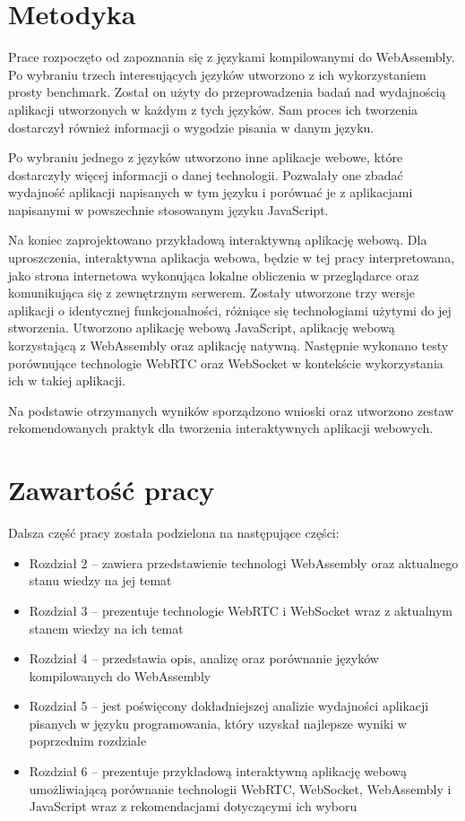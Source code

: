 \documentclass[language=polish,type=master]{aghmodern}
\begin{document}
\section{Metodyka}
Prace rozpoczęto od zapoznania się z językami kompilowanymi do WebAssembly.
Po wybraniu trzech interesujących języków utworzono z ich wykorzystaniem prosty benchmark.
Został on użyty do przeprowadzenia badań nad wydajnością aplikacji utworzonych w każdym z tych języków.
Sam proces ich tworzenia dostarczył również informacji o wygodzie pisania w danym języku.

Po wybraniu jednego z języków utworzono inne aplikacje webowe, które dostarczyły więcej informacji o danej technologii.
Pozwalały one zbadać wydajność aplikacji napisanych w tym języku i porównać je z aplikacjami napisanymi w powszechnie stosowanym języku JavaScript.

Na koniec zaprojektowano przykładową interaktywną aplikację webową.
Dla uproszczenia, interaktywna aplikacja webowa, będzie w tej pracy interpretowana, jako strona internetowa wykonująca lokalne obliczenia w przeglądarce oraz komunikująca się z zewnętrznym serwerem.
Zostały utworzone trzy wersje aplikacji o identycznej funkcjonalności, różniące się technologiami użytymi do jej stworzenia.
Utworzono aplikację webową JavaScript, aplikację webową korzystającą z WebAssembly oraz aplikację natywną.
Następnie wykonano testy porównujące technologie WebRTC oraz WebSocket w kontekście wykorzystania ich w takiej aplikacji.

Na podstawie otrzymanych wyników sporządzono wnioski oraz utworzono zestaw rekomendowanych praktyk dla tworzenia interaktywnych aplikacji webowych.

\clearpage

\section{Zawartość pracy}
Dalsza część pracy została podzielona na następujące części:

\begin{itemize}
    \item Rozdział 2 -- zawiera przedstawienie technologi WebAssembly oraz aktualnego stanu wiedzy na jej temat
    \item Rozdział 3 -- prezentuje technologie WebRTC i WebSocket wraz z aktualnym stanem wiedzy na ich temat
    \item Rozdział 4 -- przedstawia opis, analizę oraz porównanie języków kompilowanych do WebAssembly
    \item Rozdział 5 -- jest poświęcony dokładniejszej analizie wydajności aplikacji pisanych w języku programowania, który uzyskał najlepsze wyniki w poprzednim rozdziale
    \item Rozdział 6 -- prezentuje przykładową interaktywną aplikację webową umożliwiającą porównanie technologii WebRTC, WebSocket, WebAssembly i JavaScript wraz z rekomendacjami dotyczącymi ich wyboru
\end{itemize}
\end{document}
